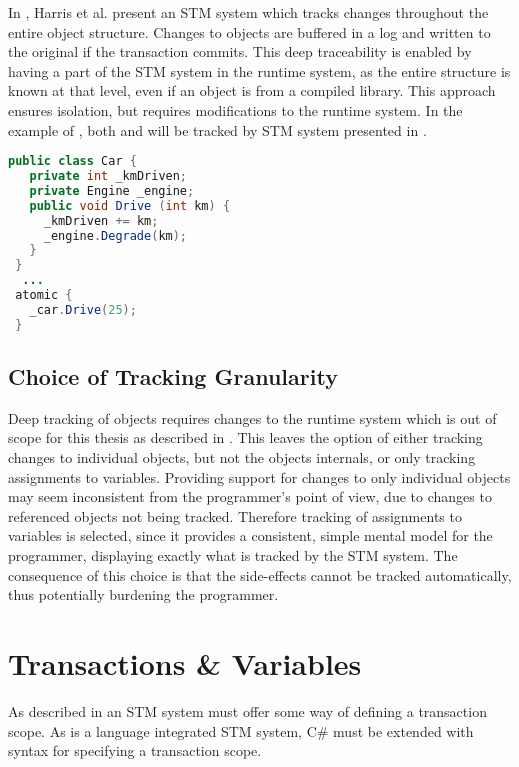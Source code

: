 In \cite{harris2003language}, Harris et al. present an \ac{STM} system which tracks changes throughout the entire object structure. Changes to objects are buffered in a log and written to the original if the transaction commits. This deep traceability is enabled by having a part of the \ac{STM} system in the runtime system, as the entire structure is known at that level, even if an object is from a compiled library. This approach ensures isolation, but requires modifications to the runtime system. In the example of , both  and  will be tracked by \ac{STM} system presented in \cite{harris2003language}.
%
\begin{lstlisting}[label=lst:tracking_object,
 float,
 caption={Tracking Changes to Object},
 language=Java, 
 showspaces=false,
 showtabs=false,
 breaklines=true,
 showstringspaces=false,
 breakatwhitespace=true,
 commentstyle=\color{greencomments},
 keywordstyle=\color{bluekeywords},
 stringstyle=\color{redstrings},
 morekeywords={atomic, retry, orElse, var, get, set}]  % Start your code-block
  public class Car {
   private int _kmDriven;
   private Engine _engine;
   public void Drive (int km) {
     _kmDriven += km;
     _engine.Degrade(km);
   }
 }
  ...
 atomic {
   _car.Drive(25);
 }
\end{lstlisting}
%
\subsection{Choice of Tracking Granularity}
Deep tracking of objects requires changes to the runtime system which is out of scope for this thesis as described in . This leaves the option of either tracking changes to individual objects, but not the objects internals, or only tracking assignments to variables. Providing support for changes to only individual objects may seem inconsistent from the programmer’s point of view, due to changes to referenced objects not being tracked. Therefore tracking of assignments to variables is selected, since it provides a consistent, simple mental model for the programmer, displaying exactly what is tracked by the \ac{STM} system. The consequence of this choice is that the side-effects cannot be tracked automatically, thus potentially burdening the programmer.

\section{Transactions \& Variables}
\label{subsec:rec_transactions_variables}
As described in  an \ac{STM} system must offer some way of defining a transaction scope. As \stmnamesp is a language integrated \ac{STM} system, C\# must be extended with syntax for specifying a transaction scope.

